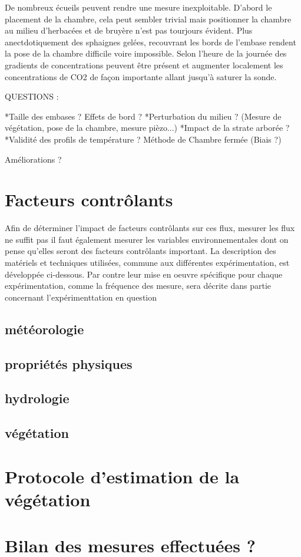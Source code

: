 De nombreux écueils peuvent rendre une mesure inexploitable. D'abord le placement de la chambre, cela peut sembler trivial mais positionner la chambre au milieu d'herbacées et de bruyère n'est pas tourjours évident. Plus anectdotiquement des sphaignes gelées, recouvrant les bords de l'embase rendent la pose de la chambre difficile voire impossible. Selon l'heure de la journée des gradients de concentrations peuvent être présent et augmenter localement les concentrations de CO2 de façon importante allant jusqu'à saturer la sonde.

QUESTIONS :

*Taille des embases ? Effets de bord ?
*Perturbation du milieu ? (Mesure de végétation, pose de la chambre, mesure pièzo...)
*Impact de la strate arborée ?
*Validité des profils de température ?
Méthode de Chambre fermée (Biais ?)

Améliorations ? 


\section{Facteurs contrôlants}
Afin de déterminer l'impact de facteurs contrôlants sur ces flux, mesurer les flux ne suffit pas il faut également mesurer les variables environnementales dont on pense qu'elles seront des facteurs contrôlants important.
La description des matériels et techniques utilisées, commune aux différentes expérimentation, est développée ci-dessous.
Par contre leur mise en oeuvre spécifique pour chaque expérimentation, comme la fréquence des mesure, sera décrite dans partie concernant l'expérimenttation en question

\subsection{météorologie}



\subsection{propriétés physiques}

\subsection{hydrologie}

\subsection{végétation}

\section{Protocole d'estimation de la végétation}


\section*{Bilan des mesures effectuées ?}